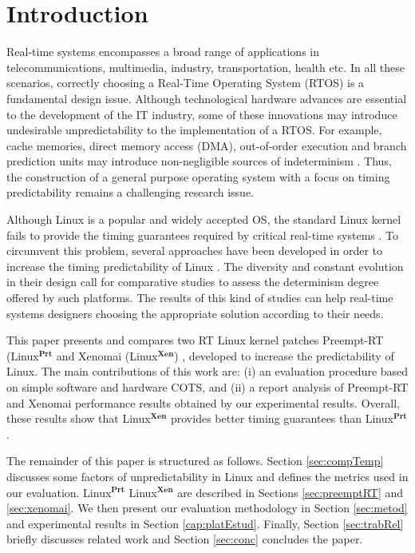 \documentclass{acm_proc_article-sp}
\newcommand{\preemptt}{{Preempt-RT }}
\begin{document}
\section{Introduction}

Real-time systems encompasses a broad range of applications in telecommunications,
multimedia, industry, transportation, health etc. In all these scenarios, correctly
choosing a Real-Time Operating System (RTOS) is a fundamental design issue. Although
technological hardware advances are essential to the development of the IT industry,
some of these innovations may introduce undesirable unpredictability to the
implementation of a RTOS. For example, cache memories, direct memory access (DMA),
out-of-order execution and branch prediction units may introduce non-negligible
sources of indeterminism \cite{Liu00, Pratt04}. Thus, the construction of a general
purpose operating system with a focus on timing predictability remains a challenging
research issue.

Although Linux is a popular and widely accepted OS, the standard Linux kernel
\cite{Bovet05} fails to provide the timing guarantees required by critical real-time
systems \cite{Marchesotti06, Abeni02}. To circumvent this problem, several
approaches have been developed in order to increase the timing predictability of
Linux \cite{PreemptRT, Xenomai, Dozio03, rtLinux, Fry07, Calandrino06}. The
diversity and constant evolution in their design call for comparative studies to
assess the determinism degree offered by such platforms. The results of this kind
of studies can help real-time systems designers choosing the appropriate solution
according to their needs.

This paper presents and compares two RT Linux kernel patches \preemptt
(Linux$^{\mathbf{Prt}}$ \cite{PreemptRT} and Xenomai (Linux$^{\mathbf{Xen}}$)
\cite{Xenomai}, developed to increase the predictability of Linux. The main
contributions of this work are: (i) an evaluation procedure based on simple software
and hardware COTS, and (ii) a report analysis of \preemptt and Xenomai performance
results obtained by our experimental results. Overall, these results show that
Linux$^{\mathbf{Xen}}$ provides better timing guarantees than
Linux$^{\mathbf{Prt}}$.

The remainder of this paper is structured as follows. Section \ref{sec:compTemp}
discusses some factors of unpredictability in Linux and defines the metrics used in
our evaluation. Linux$^{\mathbf{Prt}}$ Linux$^{\mathbf{Xen}}$ are described in
Sections \ref{sec:preemptRT} and \ref{sec:xenomai}. We then present our evaluation
methodology in Section \ref{sec:metod} and experimental results in Section
\ref{cap:platEstud}.  Finally, Section \ref{sec:trabRel} briefly discusses related
work and Section \ref{sec:conc} concludes the paper.
\end{document}
